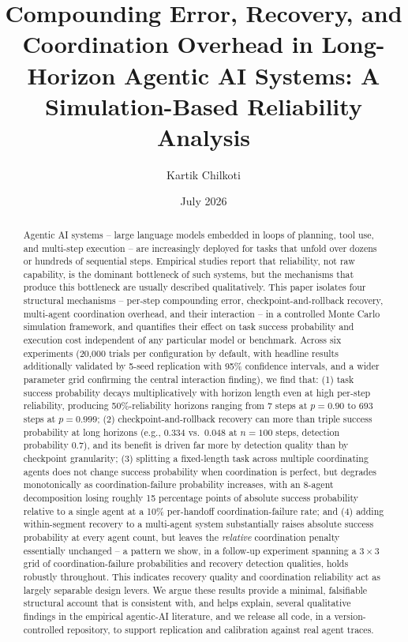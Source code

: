 \documentclass[11pt]{article}
\title{Compounding Error, Recovery, and Coordination Overhead in Long-Horizon Agentic AI Systems: A Simulation-Based Reliability Analysis}
\author{Kartik Chilkoti}
\date{July 2026}
\begin{document}
\maketitle

\begin{abstract}
Agentic AI systems -- large language models embedded in loops of planning, tool use, and multi-step execution -- are increasingly deployed for tasks that unfold over dozens or hundreds of sequential steps. Empirical studies report that reliability, not raw capability, is the dominant bottleneck of such systems, but the mechanisms that produce this bottleneck are usually described qualitatively. This paper isolates four structural mechanisms -- per-step compounding error, checkpoint-and-rollback recovery, multi-agent coordination overhead, and their interaction -- in a controlled Monte Carlo simulation framework, and quantifies their effect on task success probability and execution cost independent of any particular model or benchmark. Across six experiments (20,000 trials per configuration by default, with headline results additionally validated by 5-seed replication with 95\% confidence intervals, and a wider parameter grid confirming the central interaction finding), we find that: (1) task success probability decays multiplicatively with horizon length even at high per-step reliability, producing 50\%-reliability horizons ranging from 7 steps at $p=0.90$ to 693 steps at $p=0.999$; (2) checkpoint-and-rollback recovery can more than triple success probability at long horizons (e.g., 0.334 vs.\ 0.048 at $n=100$ steps, detection probability 0.7), and its benefit is driven far more by detection quality than by checkpoint granularity; (3) splitting a fixed-length task across multiple coordinating agents does not change success probability when coordination is perfect, but degrades monotonically as coordination-failure probability increases, with an 8-agent decomposition losing roughly 15 percentage points of absolute success probability relative to a single agent at a 10\% per-handoff coordination-failure rate; and (4) adding within-segment recovery to a multi-agent system substantially raises absolute success probability at every agent count, but leaves the \emph{relative} coordination penalty essentially unchanged -- a pattern we show, in a follow-up experiment spanning a $3\times3$ grid of coordination-failure probabilities and recovery detection qualities, holds robustly throughout. This indicates recovery quality and coordination reliability act as largely separable design levers. We argue these results provide a minimal, falsifiable structural account that is consistent with, and helps explain, several qualitative findings in the empirical agentic-AI literature, and we release all code, in a version-controlled repository, to support replication and calibration against real agent traces.
\end{abstract}
\end{document}
